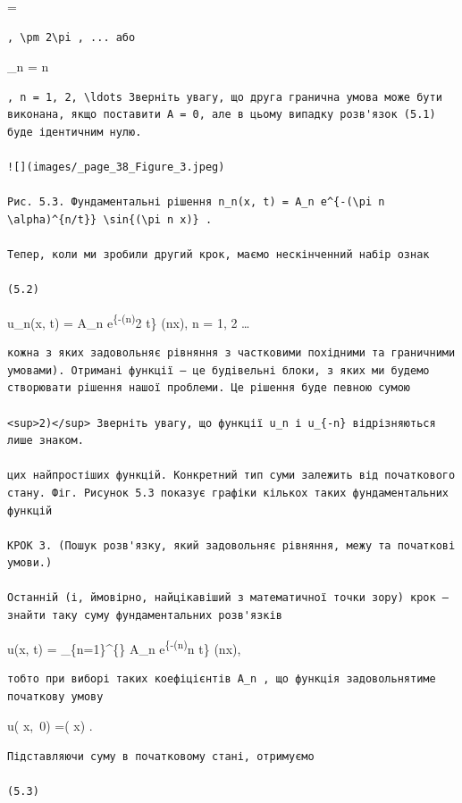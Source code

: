 \documentclass[
  ukrainian,
]{article}
\begin{document}
\lambda = \pm \pi

\begin{verbatim}
, \pm 2\pi , ... або
\end{verbatim}

\lambda\_n = \pm n\pi

\begin{verbatim}
, n = 1, 2, \ldots Зверніть увагу, що друга гранична умова може бути виконана, якщо поставити A = 0, але в цьому випадку розв'язок (5.1) буде ідентичним нулю.

![](images/_page_38_Figure_3.jpeg)

Рис. 5.3. Фундаментальні рішення n_n(x, t) = A_n e^{-(\pi n \alpha)^{n/t}} \sin{(\pi n x)} .

Тепер, коли ми зробили другий крок, маємо нескінченний набір ознак

(5.2)
\end{verbatim}

u\_n(x, t) = A\_n e\textsuperscript{\{-(n\pi\alpha)}2 t\} \sin(n\pi x),
\quad n = 1, 2 \dots

\begin{verbatim}
кожна з яких задовольняє рівняння з частковими похідними та граничними умовами). Отримані функції — це будівельні блоки, з яких ми будемо створювати рішення нашої проблеми. Це рішення буде певною сумою

<sup>2)</sup> Зверніть увагу, що функції u_n і u_{-n} відрізняються лише знаком.

цих найпростіших функцій. Конкретний тип суми залежить від початкового стану. Фіг. Рисунок 5.3 показує графіки кількох таких фундаментальних функцій

КРОК 3. (Пошук розв'язку, який задовольняє рівняння, межу та початкові умови.)

Останній (і, ймовірно, найцікавіший з математичної точки зору) крок — знайти таку суму фундаментальних розв'язків
\end{verbatim}

u(x, t) = \sum\_\{n=1\}\^{}\{\infty\} A\_n
e\textsuperscript{\{-(n\pi\alpha)}n t\} \sin(n\pi x),

\begin{verbatim}
тобто при виборі таких коефіцієнтів A_n , що функція задовольнятиме початкову умову
\end{verbatim}

u\left( x,~0\right) =\varphi\left( x\right) .

\begin{verbatim}
Підставляючи суму в початковому стані, отримуємо

(5.3)
\end{verbatim}
\end{document}
